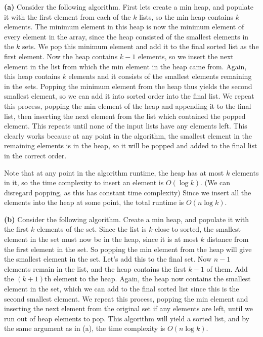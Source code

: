 \documentclass[11pt,letterpaper]{article}
\begin{document}
\begin{solution}
    \textbf{(a)} Consider the following algorithm. First lets create a min heap, and populate it with the first element from each of the $k$ lists, so the min heap contains $k$ elements. The minimum element in this heap is now the minimum element of every element in the array, since the heap consisted of the smallest elements in the $k$ sets. We pop this minimum element and add it to the final sorted list as the first element. Now the heap contains $k-1$ elements, so we insert the next element in the list from which the min element in the heap came from. Again, this heap contains $k$ elements and it consists of the smallest elements remaining in the sets. Popping the minimum element from the heap thus yields the second smallest element, so we can add it into sorted order into the final list. We repeat this process, popping the min element of the heap and appending it to the final list, then inserting the next element from the list which contained the popped element. This repeats until none of the input lists have any elements left. This clearly works because at any point in the algorithm, the smallest element in the remaining elements is in the heap, so it will be popped and added to the final list in the correct order.

    Note that at any point in the algorithm runtime, the heap has at most $k$ elements in it, so the time complexity to insert an element is $O(\log k)$. (We can disregard popping, as this has constant time complexity) Since we insert all the elements into the heap at some point, the total runtime is $O(n\log k)$.
    
    \textbf{(b)} Consider the following algorithm. Create a min heap, and populate it with the first $k$ elements of the set. Since the list is $k$-close to sorted, the smallest element in the set must now be in the heap, since it is at most $k$ distance from the first element in the set. So popping the min element from the heap will give the smallest element in the set. Let's add this to the final set. Now $n-1$ elements remain in the list, and the heap contains the first $k-1$ of them. Add the $(k+1)$th element to the heap. Again, the heap now contains the smallest element in the set, which we can add to the final sorted list since this is the second smallest element. We repeat this process, popping the min element and inserting the next element from the original set if any elements are left, until we run out of heap elements to pop. This algorithm will yield a sorted list, and by the same argument as in (a), the time complexity is $O(n\log k)$.
    

\end{solution}
\end{document}
